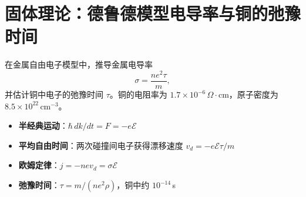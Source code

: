 \section{固体理论：德鲁德模型电导率与铜的弛豫时间}
\label{sec:drude-conductivity}

\begin{modelbox}[题目：金属电导率公式的推导与铜中电子弛豫时间]
在金属自由电子模型中，推导金属电导率
\[
\sigma=\frac{ne^2\tau}{m},
\]
并估计铜中电子的弛豫时间 $\tau$。铜的电阻率为 $1.7\times10^{-6}\,\Omega\cdot\text{cm}$，原子密度为 $8.5\times10^{22}\,\text{cm}^{-3}$。
\end{modelbox}

\begin{tipbox}[考点快速分析]
\begin{itemize}
    \item \textbf{半经典运动}：$\hbar\,dk/dt=F=-e\mathcal{E}$
    \item \textbf{平均自由时间}：两次碰撞间电子获得漂移速度 $v_d=-e\mathcal{E}\tau/m$
    \item \textbf{欧姆定律}：$j=-nev_d=\sigma\mathcal{E}$
    \item \textbf{弛豫时间}：$\tau=m/(ne^2\rho)$，铜中约 $10^{-14}\,$s
\end{itemize}
\end{tipbox}

